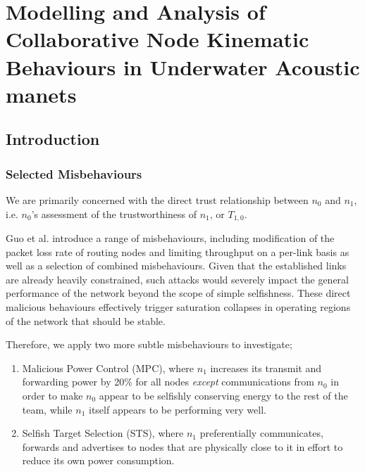 \def\ChapterTitle{Modelling and Analysis of Collaborative Node Kinematic Behaviours in Underwater Acoustic \gls{manet}s}

\ifx\ifthesis\undefined

\else
\chapter{\ChapterTitle}
\label{Chapter\thechapter}
\fi

\section{Introduction}\label{sec:introduction}





\subsection{Selected Misbehaviours}


We are primarily concerned with the direct trust relationship between $n_0$ and $n_1$, i.e. $n_0$'s assessment of the trustworthiness of $n_1$, or $T_{1,0}$.

Guo et al. introduce a range of misbehaviours, including modification of the packet loss rate of routing nodes and limiting throughput on a per-link basis as well as a selection of combined misbehaviours. 
Given that the established links are already heavily constrained, such attacks would severely impact the general performance of the network beyond the scope of simple selfishness.
These direct malicious behaviours effectively trigger saturation collapses in operating regions of the network that should be stable.

Therefore, we apply two more subtle misbehaviours to investigate; 
\begin{enumerate}
	\item Malicious Power Control (MPC), where $n_1$ increases its transmit and forwarding power by 20\% for all nodes \emph{except} communications from $n_0$ in order to make $n_0$ appear to be selfishly conserving energy to the rest of the team, while $n_1$ itself appears to be performing very well.
	\item Selfish Target Selection (STS), where $n_1$ preferentially communicates, forwards and advertises to nodes that are physically close to it in effort to reduce its own power consumption.
\end{enumerate}



